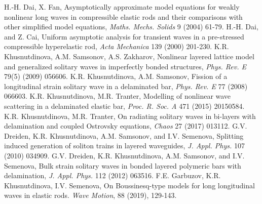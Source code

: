 \documentclass[12pt, a4paper]{report}
\begin{document}
\begin{thebibliography}{99}
	 H.-H. Dai, X. Fan, Asymptotically approximate model equations for weakly nonlinear long waves in compressible elastic rods and their comparisons with other simplified model equations, \textit{Maths. Mechs. Solids} 9 (2004) 61-79.
	 H.-H. Dai, and Z. Cai, Uniform asymptotic analysis for transient waves in a pre-stressed compressible hyperelastic rod, \textit{Acta Mechanica} 139 (2000) 201-230.
	 K.R. Khusnutdinova, A.M. Samsonov, A.S. Zakharov, Nonlinear layered lattice model and generalized solitary waves in imperfectly bonded structures, \textit{Phys. Rev. E} 79(5) (2009) 056606.
	 K.R. Khusnutdinova, A.M. Samsonov, Fission of a longitudinal strain solitary wave in a delaminated bar, \textit{Phys. Rev. E} 77 (2008) 066603.
	 K.R. Khusnutdinova, M.R. Tranter, Modelling of nonlinear wave scattering in a delaminated elastic bar, \textit{Proc. R. Soc. A} 471 (2015) 20150584.
	 K.R. Khusnutdinova, M.R. Tranter, On radiating solitary waves in bi-layers with delamination and coupled Ostrovsky equations, \textit{Chaos} 27 (2017) 013112.
	 G.V. Dreiden, K.R. Khusnutdinova, A.M. Samsonov, and I.V. Semenova, Splitting induced generation of soliton trains in layered waveguides, \textit{J. Appl. Phys.} 107 (2010) 034909.
	 G.V. Dreiden, K.R. Khusnutdinova, A.M. Samsonov, and I.V. Semenova, Bulk strain solitary waves in bonded layered polymeric bars with delamination, \textit{J. Appl. Phys.} 112 (2012) 063516.
	 F.E. Garbuzov, K.R. Khusnutdinova, I.V. Semenova, On Boussinesq-type models for long longitudinal waves in elastic rods. \textit{Wave Motion}, 88 (2019), 129-143.
	

\end{thebibliography}
\end{document}
